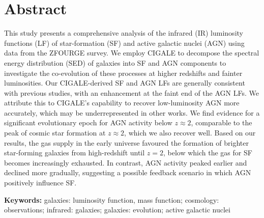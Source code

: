 \chapter{Abstract}
\thispagestyle{empty}

This study presents a comprehensive analysis of the infrared (IR) luminosity functions (LF) of star-formation (SF) and active galactic nuclei (AGN) using data from the ZFOURGE survey. We employ CIGALE to decompose the spectral energy distribution (SED) of galaxies into SF and AGN components to investigate the co-evolution of these processes at higher redshifts and fainter luminosities. Our CIGALE-derived SF and AGN LFs are generally consistent with previous studies, with an enhancement at the faint end of the AGN LFs. We attribute this to CIGALE's capability to recover low-luminosity AGN more accurately, which may be underrepresented in other works. We find evidence for a significant evolutionary epoch for AGN activity below $z \approx 2$, comparable to the peak of cosmic star formation at $z \approx 2$, which we also recover well. Based on our results, the gas supply in the early universe favoured the formation of brighter star-forming galaxies from high-redshift until $z=2$, below which the gas for SF becomes increasingly exhausted. In contrast, AGN activity peaked earlier and declined more gradually, suggesting a possible feedback scenario in which AGN positively influence SF. 

\vspace{1cm}
\noindent
\textbf{Keywords:} galaxies: luminosity function, mass function; cosmology: observations; infrared: galaxies; galaxies: evolution; active galactic nuclei